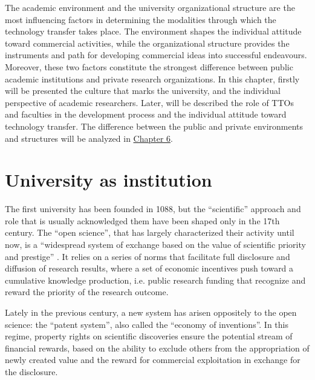 

\label{Chapter2} %

The academic environment and the university organizational structure are the most influencing factors in determining the modalities through which the technology transfer takes place. The environment shapes the individual attitude toward commercial activities, while the organizational structure provides the instruments and path for developing commercial ideas into successful endeavours. Moreover, these two factors constitute the strongest difference between public academic institutions and private research organizations. In this chapter, firstly will be presented the culture that marks the university, and the individual perspective of academic researchers. Later, will be described the role of TTOs and faculties in the development process and the individual attitude toward technology transfer. The difference between the public and private environments and structures will be analyzed in \hyperref[Chapter6]{Chapter 6}.

\section{University as institution}

The first university has been founded in 1088, but the \enquote{scientific} approach and role that is usually acknowledged them have been shaped only in the 17th century. The \enquote{open science}, that has largely characterized their activity until now, is a \enquote{widespread system of exchange based on the value of scientific priority and prestige} \citep{Murray2005}. It relies on a series of norms that facilitate full disclosure and diffusion of research results, where a set of economic incentives push toward a cumulative knowledge production, i.e. public research funding that recognize and reward the priority of the research outcome.

Lately in the previous century, a new system has arisen oppositely to the open science: the \enquote{patent system}, also called the \enquote{economy of inventions}. In this regime, property rights on scientific discoveries ensure the potential stream of financial rewards, based on the ability to exclude others from the appropriation of newly created value and the reward for commercial exploitation in exchange for the disclosure. 

